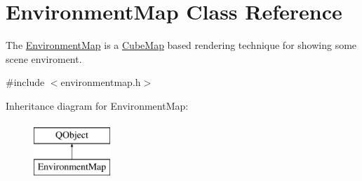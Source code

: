 \hypertarget{class_environment_map}{}\section{Environment\+Map Class Reference}
\label{class_environment_map}


The \hyperlink{class_environment_map}{Environment\+Map} is a \hyperlink{class_cube_map}{Cube\+Map} based rendering technique for showing some scene enviroment.  




{\ttfamily \#include $<$environmentmap.\+h$>$}

Inheritance diagram for Environment\+Map\+:\begin{figure}[H]
\begin{center}
\leavevmode
\includegraphics[height=2.000000cm]{class_environment_map}
\end{center}
\end{figure}
